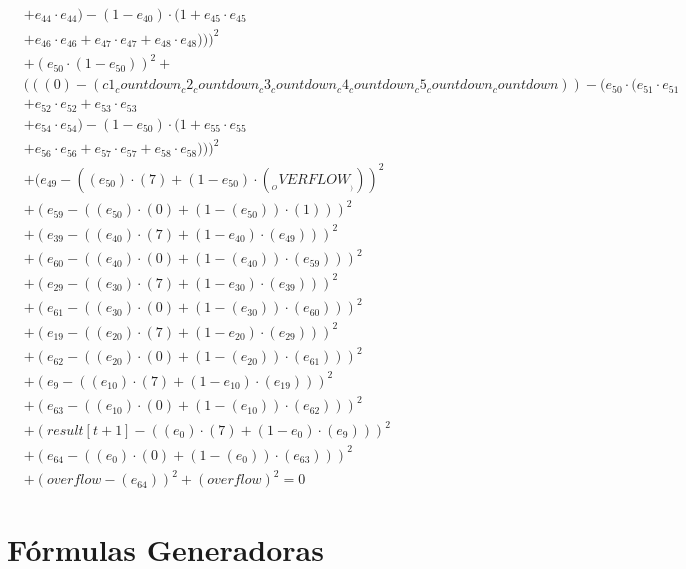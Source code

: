 \documentclass[10pt, a4paper]{article}
\begin{document}
\begin{align*}
& + e_{44} \cdot e_{44}) - (1 - e_{40}) \cdot (1 + e_{45} \cdot e_{45} \\
& + e_{46} \cdot e_{46} + e_{47} \cdot e_{47} + e_{48} \cdot e_{48})))^{2} \\
& + (e_{50} \cdot (1 - e_{50}))^{2} + \\
& (((0) - (c1_countdown_c2_countdown_c3_countdown_c4_countdown_c5_countdown_countdown)) - (e_{50} \cdot (e_{51} \cdot e_{51} \\
& + e_{52} \cdot e_{52} + e_{53} \cdot e_{53} \\
& + e_{54} \cdot e_{54}) - (1 - e_{50}) \cdot (1 + e_{55} \cdot e_{55} \\
& + e_{56} \cdot e_{56} + e_{57} \cdot e_{57} + e_{58} \cdot e_{58})))^{2} \\
& + (e_{49} - ((e_{50})  \cdot  (7) + (1 - e_{50})  \cdot  (__OVERFLOW__)))^{2} \\
& + (e_{59} - ((e_{50}) \cdot (0) + (1 - (e_{50})) \cdot (1)))^{2} \\
& + (e_{39} - ((e_{40})  \cdot  (7) + (1 - e_{40})  \cdot  (e_{49})))^{2} \\
& + (e_{60} - ((e_{40}) \cdot (0) + (1 - (e_{40})) \cdot (e_{59})))^{2} \\
& + (e_{29} - ((e_{30})  \cdot  (7) + (1 - e_{30})  \cdot  (e_{39})))^{2} \\
& + (e_{61} - ((e_{30}) \cdot (0) + (1 - (e_{30})) \cdot (e_{60})))^{2} \\
& + (e_{19} - ((e_{20})  \cdot  (7) + (1 - e_{20})  \cdot  (e_{29})))^{2} \\
& + (e_{62} - ((e_{20}) \cdot (0) + (1 - (e_{20})) \cdot (e_{61})))^{2} \\
& + (e_{9} - ((e_{10})  \cdot  (7) + (1 - e_{10})  \cdot  (e_{19})))^{2} \\
& + (e_{63} - ((e_{10}) \cdot (0) + (1 - (e_{10})) \cdot (e_{62})))^{2} \\
& + (result[t+1] - ((e_{0})  \cdot  (7) + (1 - e_{0})  \cdot  (e_{9})))^{2} \\
& + (e_{64} - ((e_{0}) \cdot (0) + (1 - (e_{0})) \cdot (e_{63})))^{2} \\
& + (overflow - (e_{64}))^{2} + (overflow)^{2} = 0
\end{align*}\part{Fórmulas Generadoras}
\end{document}
